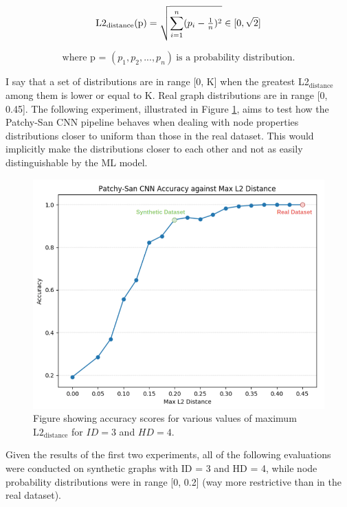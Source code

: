 \begin{equation} 
    \centering
    \text{L2}_\text{distance}\text{(p)} = \sqrt{\sum_{i=1}^{n} (p_i - \tfrac{1}{n})^2} \in [0,\sqrt{2}] \newline
\end{equation} \label{l2_distance}

$$ \text{where p = }(p_1, p_2, ..., p_n) \ \text{is a probability distribution.} $$ 

I say that a set of distributions are in range [0, K] when the greatest L2$_{\text{distance}}$ among them is lower or equal to K. Real graph distributions are in range [0, 0.45]. The following experiment, illustrated in Figure \ref{l2_dist}, aims to test how the Patchy-San CNN pipeline behaves when dealing with node properties distributions closer to uniform than those in the real dataset. This would implicitly make the distributions closer to each other and not as easily distinguishable by the ML model. \\

\begin{figure}[H]
  \centering
  \centerline{\includegraphics[scale=0.35]{Images/l2_dist.png}}
  \caption{ Figure showing accuracy scores for various values of maximum $\text{L2}_{\text{distance}}$ for $ID = 3$ and $HD = 4$.}
  \label{l2_dist}
\end{figure}

Given the results of the first two experiments, all of the following evaluations were conducted on synthetic graphs with ID = 3 and HD = 4, while node probability distributions were in range [0, 0.2] (way more restrictive than in the real dataset). \\

